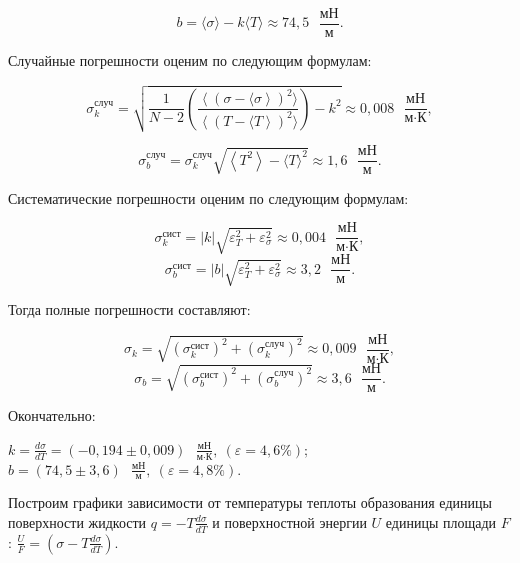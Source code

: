 \documentclass[a4paper,12pt]{article} %
\begin{document}
{\medskip

\[ b = \langle \sigma \rangle - k\langle T \rangle \approx 74,5\text{ } \frac{\text{мН}}{\text{м}}. \]

\medskip

\noindent Случайные погрешности оценим по следующим формулам:

\medskip

\[ \sigma^\text{случ}_k = \sqrt{\frac{1}{N-2} \left(\frac{\left\langle\left(\sigma - \langle \sigma\right\rangle\right)^2 \rangle}{\left\langle\left(T - \langle T\right\rangle\right)^2 \rangle}\right)-k^2} \approx 0,008 \text{ } \frac{\text{мН}}{\text{м}\cdot\text{К}},\]

\medskip

\[ \sigma^\text{случ}_b=\sigma^\text{случ}_k\sqrt{\left\langle T^2 \right\rangle - {\langle T \rangle}^2} \approx 1,6\text{ } \frac{\text{мН}}{\text{м}}. \]

\medskip

\noindent Систематические погрешности оценим по следующим формулам:

\medskip

\[ \sigma^\text{сист}_k = |k|\sqrt{\varepsilon^2_T+\varepsilon^2_\sigma} \approx 0,004 \text{ } \frac{\text{мН}}{\text{м}\cdot\text{К}}, \]
\[ \sigma^\text{сист}_b = |b|\sqrt{\varepsilon^2_T+\varepsilon^2_\sigma} \approx 3,2 \text{ } \frac{\text{мН}}{\text{м}}. \]

\medskip


\noindent Тогда полные погрешности составляют:

\medskip

\[ \sigma_k = \sqrt{(\sigma_k^\text{сист})^2 + (\sigma_k^\text{случ})^2} \approx 0,009 \text{ } \frac{\text{мН}}{\text{м}\cdot\text{К}},\]
\[ \sigma_b = \sqrt{(\sigma_b^\text{сист})^2 + (\sigma_b^\text{случ})^2} \approx 3,6 \text{ } \frac{\text{мН}}{\text{м}}. \]

\medskip

\noindent Окончательно:

\medskip

	 $ \displaystyle {k = \frac{d\sigma}{dT} = (-0,194 \pm 0,009) \text{ } \frac{\text{мН}}{\text{м}\cdot\text{К}}, \: (\varepsilon = 4,6\%);} $
	 $ \displaystyle {b = (74,5 \pm 3,6) \text{ } \frac{\text{мН}}{\text{м}}, \: (\varepsilon = 4,8\%).}$


\medskip


\noindent Построим графики зависимости от температуры теплоты образования единицы поверхности жидкости $ \displaystyle {q = -T\frac{d\sigma}{dT}} $ и поверхностной энергии $ U $ единицы площади $ F $: $ \displaystyle {\frac{U}{F} = \left(\sigma - T \frac{d\sigma}{dT}\right).} $


}
\end{document}
